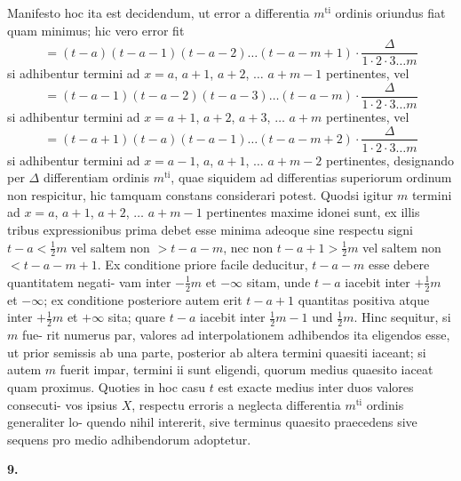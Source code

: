 \documentclass[12pt,a4paper]{article}
\begin{document}
\smallskip\noindent
Manifesto hoc ita est decidendum, ut error a differentia $m^{\mathrm{ti}}$ ordinis oriundus fiat
quam minimus; hic vero error fit
\begin{equation*}
= (t-a)(t-a-1)(t-a-2)\dots(t-a-m+1)\cdot\frac{\Delta}{1\cdot 2\cdot 3\dots m}
\end{equation*}
si adhibentur termini ad $x=a$, $a+1$, $a+2$, $\dots$ $a+m-1$ pertinentes, vel
\begin{equation*}
= (t-a-1)(t-a-2)(t-a-3)\dots(t-a-m)\cdot\frac{\Delta}{1\cdot 2\cdot 3\dots m}
\end{equation*}
si adhibentur termini ad $x=a+1$, $a+2$, $a+3$, $\dots$ $a+m$ pertinentes, vel
\begin{equation*}
= (t-a+1)(t-a)(t-a-1)\dots(t-a-m+2)\cdot\frac{\Delta}{1\cdot 2\cdot 3\dots m}
\end{equation*}
si adhibentur termini ad $x=a-1$, $a$, $a+1$, $\dots$ $a+m-2$ pertinentes, designando
per $\Delta$ differentiam ordinis $m^{\mathrm{ti}}$, quae siquidem ad differentias superiorum ordinum
non respicitur, hic tamquam constans considerari potest. Quodsi igitur $m$ termini
ad $x=a$, $a+1$, $a+2$, $\dots$ $a+m-1$ pertinentes maxime idonei sunt, ex illis
tribus expressionibus prima debet esse minima adeoque sine respectu signi $t-a<\frac{1}{2}m$
vel saltem non $>t-a-m$, nec non $t-a+1>\frac{1}{2}m$ vel saltem non $<t-a-m+1$.
Ex conditione priore facile deducitur, $t-a-m$ esse debere quantitatem negati-
vam inter $-\frac{1}{2}m$ et $-\infty$ sitam, unde $t-a$ iacebit inter $+\frac{1}{2}m$ et $-\infty$; ex
conditione posteriore autem erit $t-a+1$ quantitas positiva atque inter $+\frac{1}{2}m$ et
$+\infty$ sita; quare $t-a$ iacebit inter $\frac{1}{2}m-1$ und $\frac{1}{2}m$. Hinc sequitur, si $m$ fue-
rit numerus par, valores ad interpolationem adhibendos ita eligendos esse, ut
prior semissis ab una parte, posterior ab altera termini quaesiti iaceant; si autem
$m$ fuerit impar, termini ii sunt eligendi, quorum medius quaesito iaceat quam
proximus. Quoties in hoc casu $t$ est exacte medius inter duos valores consecuti-
vos ipsius $X$, respectu erroris a neglecta differentia $m^{\mathrm{ti}}$ ordinis generaliter lo-
quendo nihil intererit, sive terminus quaesito praecedens sive sequens pro medio
adhibendorum adoptetur.

\smallskip\noindent
\textbf{9.}
\end{document}
